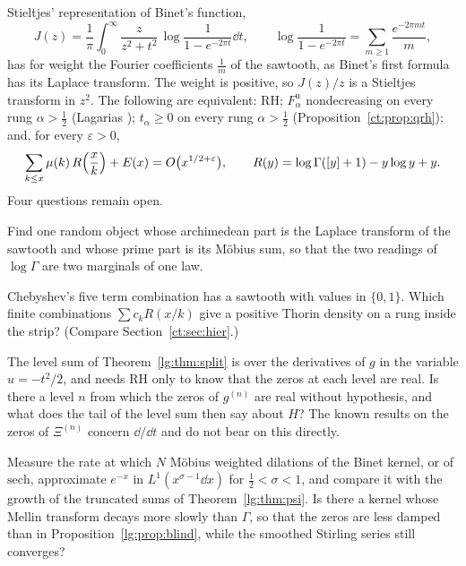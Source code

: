 Stieltjes' representation of Binet's function,
\[
J(z)=\frac1\pi\int_0^\infty\frac z{z^2+t^2}\,\log\frac1{1-e^{-2\pi t}}\dd t,\qquad\log\frac1{1-e^{-2\pi t}}=\sum_{m\ge1}\frac{e^{-2\pi mt}}m,
\]
has for weight the Fourier coefficients $\frac1m$ of the sawtooth, as Binet's first formula has its Laplace transform. The weight is positive, so $J(z)/z$ is a Stieltjes transform in $z^2$.
The following are equivalent: RH; $F^{\mathrm u}_\alpha$ nondecreasing on every rung $\alpha>\frac12$ (Lagarias \cite{Lagarias}); $t_\alpha\ge0$ on every rung $\alpha>\frac12$ (Proposition~\ref{ct:prop:qrh}); and, for every $\varepsilon>0$,
\[
\sum_{k\le x}\mu(k)\,R\Bigl(\frac xk\Bigr)+E(x)=O\bigl(x^{1/2+\varepsilon}\bigr),\qquad R(y)=\log\Gamma([y]+1)-y\log y+y .
\]
Four questions remain open.
\begin{problem}
Find one random object whose archimedean part is the Laplace transform of the sawtooth and whose prime part is its Möbius sum, so that the two readings of $\log\Gamma$ are two marginals of one law.
\end{problem}
\begin{problem}
Chebyshev's five term combination has a sawtooth with values in $\{0,1\}$. Which finite combinations $\sum c_kR(x/k)$ give a positive Thorin density on a rung inside the strip? (Compare Section~\ref{ct:sec:hier}.)
\end{problem}
\begin{problem}
The level sum of Theorem~\ref{lg:thm:split} is over the derivatives of $g$ in the variable $u=-t^2/2$, and needs RH only to know that the zeros at each level are real. Is there a level $n$ from which the zeros of $g^{(n)}$ are real without hypothesis, and what does the tail of the level sum then say about $H$? The known results on the zeros of $\Xi^{(n)}$ concern $\dd/\dd t$ and do not bear on this directly.
\end{problem}
\begin{problem}
Measure the rate at which $N$ Möbius weighted dilations of the Binet kernel, or of $\mathrm{sech}$, approximate $e^{-x}$ in $L^1(x^{\sigma-1}\dd x)$ for $\frac12<\sigma<1$, and compare it with the growth of the truncated sums of Theorem~\ref{lg:thm:psi}. Is there a kernel whose Mellin transform decays more slowly than $\Gamma$, so that the zeros are less damped than in Proposition~\ref{lg:prop:blind}, while the smoothed Stirling series still converges?
\end{problem}
